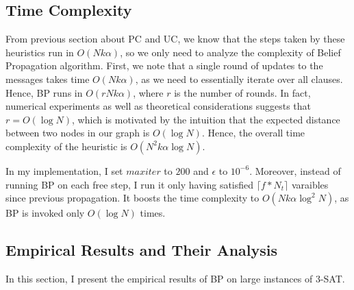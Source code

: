 \documentclass[10pt]{article}
\begin{document}
\subsection*{Time Complexity}
From previous section about PC and UC, we know that the steps taken by these heuristics run in $O(N k \alpha)$, so we only need to analyze the complexity of Belief Propagation algorithm. First, we note that a single round of updates to the messages takes time $O(N k \alpha)$, as we need to essentially iterate over all clauses. Hence, BP runs in $O(r N k \alpha)$, where $r$ is the number of rounds. In fact, numerical experiments as well as theoretical considerations suggests that $r = O(\log N)$, which is motivated by the intuition that the expected distance between two nodes in our graph is $O(\log N)$. Hence, the overall time complexity of the heuristic is $O(N^2 k \alpha \log N)$.
\par  
In my implementation, I set $maxiter$ to $200$ and $\epsilon$ to $10^{-6}$. Moreover, instead of running BP on each free step, I run it only having satisfied $\lceil f * N_t \rceil$ varaibles since previous propagation. It boosts the time complexity to $O(N k \alpha \log^2 N)$, as BP is invoked only $O(\log N)$ times.

\subsection*{Empirical Results and Their Analysis}
In this section, I present the empirical results of BP on large instances of 3-SAT.




{}
\end{document}
